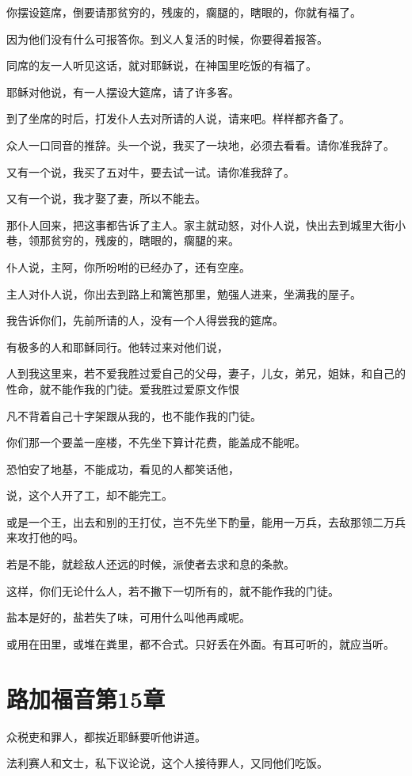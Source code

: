 \documentclass[12pt,oneside]{book}
\begin{document}
你摆设筵席，倒要请那贫穷的，残废的，瘸腿的，瞎眼的，你就有福了。

因为他们没有什么可报答你。到义人复活的时候，你要得着报答。

同席的友一人听见这话，就对耶稣说，在神国里吃饭的有福了。

耶稣对他说，有一人摆设大筵席，请了许多客。

到了坐席的时后，打发仆人去对所请的人说，请来吧。样样都齐备了。

众人一口同音的推辞。头一个说，我买了一块地，必须去看看。请你准我辞了。

又有一个说，我买了五对牛，要去试一试。请你准我辞了。

又有一个说，我才娶了妻，所以不能去。

那仆人回来，把这事都告诉了主人。家主就动怒，对仆人说，快出去到城里大街小巷，领那贫穷的，残废的，瞎眼的，瘸腿的来。

仆人说，主阿，你所吩咐的已经办了，还有空座。

主人对仆人说，你出去到路上和篱笆那里，勉强人进来，坐满我的屋子。

我告诉你们，先前所请的人，没有一个人得尝我的筵席。

有极多的人和耶稣同行。他转过来对他们说，

人到我这里来，若不爱我胜过爱自己的父母，妻子，儿女，弟兄，姐妹，和自己的性命，就不能作我的门徒。爱我胜过爱原文作恨

凡不背着自己十字架跟从我的，也不能作我的门徒。

你们那一个要盖一座楼，不先坐下算计花费，能盖成不能呢。

恐怕安了地基，不能成功，看见的人都笑话他，

说，这个人开了工，却不能完工。

或是一个王，出去和别的王打仗，岂不先坐下酌量，能用一万兵，去敌那领二万兵来攻打他的吗。

若是不能，就趁敌人还远的时候，派使者去求和息的条款。

这样，你们无论什么人，若不撇下一切所有的，就不能作我的门徒。

盐本是好的，盐若失了味，可用什么叫他再咸呢。

或用在田里，或堆在粪里，都不合式。只好丢在外面。有耳可听的，就应当听。

\chapter{路加福音第15章}
众税吏和罪人，都挨近耶稣要听他讲道。

法利赛人和文士，私下议论说，这个人接待罪人，又同他们吃饭。
\end{document}
